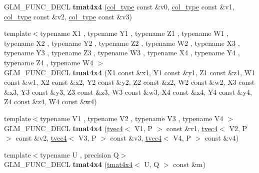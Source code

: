 \begin{DoxyCompactItemize}
\item 
G\+L\+M\+\_\+\+F\+U\+N\+C\+\_\+\+D\+E\+CL {\bfseries tmat4x4} (\hyperlink{structglm_1_1detail_1_1tvec4}{col\+\_\+type} const \&v0, \hyperlink{structglm_1_1detail_1_1tvec4}{col\+\_\+type} const \&v1, \hyperlink{structglm_1_1detail_1_1tvec4}{col\+\_\+type} const \&v2, \hyperlink{structglm_1_1detail_1_1tvec4}{col\+\_\+type} const \&v3)\hypertarget{structglm_1_1detail_1_1tmat4x4_a65b09ee09ead59d815720ec0e73737fb}{}\label{structglm_1_1detail_1_1tmat4x4_a65b09ee09ead59d815720ec0e73737fb}

\item 
{\footnotesize template$<$typename X1 , typename Y1 , typename Z1 , typename W1 , typename X2 , typename Y2 , typename Z2 , typename W2 , typename X3 , typename Y3 , typename Z3 , typename W3 , typename X4 , typename Y4 , typename Z4 , typename W4 $>$ }\\G\+L\+M\+\_\+\+F\+U\+N\+C\+\_\+\+D\+E\+CL {\bfseries tmat4x4} (X1 const \&x1, Y1 const \&y1, Z1 const \&z1, W1 const \&w1, X2 const \&x2, Y2 const \&y2, Z2 const \&z2, W2 const \&w2, X3 const \&x3, Y3 const \&y3, Z3 const \&z3, W3 const \&w3, X4 const \&x4, Y4 const \&y4, Z4 const \&z4, W4 const \&w4)\hypertarget{structglm_1_1detail_1_1tmat4x4_afe1431c016d4a0261e597d4c4794d45c}{}\label{structglm_1_1detail_1_1tmat4x4_afe1431c016d4a0261e597d4c4794d45c}

\item 
{\footnotesize template$<$typename V1 , typename V2 , typename V3 , typename V4 $>$ }\\G\+L\+M\+\_\+\+F\+U\+N\+C\+\_\+\+D\+E\+CL {\bfseries tmat4x4} (\hyperlink{structglm_1_1detail_1_1tvec4}{tvec4}$<$ V1, P $>$ const \&v1, \hyperlink{structglm_1_1detail_1_1tvec4}{tvec4}$<$ V2, P $>$ const \&v2, \hyperlink{structglm_1_1detail_1_1tvec4}{tvec4}$<$ V3, P $>$ const \&v3, \hyperlink{structglm_1_1detail_1_1tvec4}{tvec4}$<$ V4, P $>$ const \&v4)\hypertarget{structglm_1_1detail_1_1tmat4x4_a1d5edd29def5b7c600505373f7dab5a2}{}\label{structglm_1_1detail_1_1tmat4x4_a1d5edd29def5b7c600505373f7dab5a2}

\item 
{\footnotesize template$<$typename U , precision Q$>$ }\\G\+L\+M\+\_\+\+F\+U\+N\+C\+\_\+\+D\+E\+CL {\bfseries tmat4x4} (\hyperlink{structglm_1_1detail_1_1tmat4x4}{tmat4x4}$<$ U, Q $>$ const \&m)\hypertarget{structglm_1_1detail_1_1tmat4x4_a075d7a65803598d3f219f23ca08ba21f}{}\label{structglm_1_1detail_1_1tmat4x4_a075d7a65803598d3f219f23ca08ba21f}


\end{DoxyCompactItemize}
